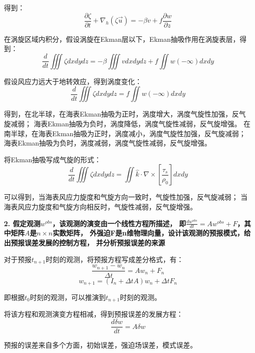 \documentclass{article}
\begin{document}
得到：
$$\frac{\partial\zeta}{\partial t} + \nabla_h(\zeta\vec{u})
=-\beta v +f\frac{\partial w}{\partial z}$$

在涡旋区域内积分，假设涡旋在Ekman层以下，Ekman抽吸作用在涡旋表层，得到：
$$\frac{d}{dt}\iiint\zeta dxdydz
=-\beta\iiint v dxdydz + f\iint w(-\infty) dxdy$$

假设风应力远大于地转效应，得到涡度变化：
$$\frac{d}{dt}\iiint\zeta dxdydz
= f\iint  w(-\infty) dxdy$$

得到，在北半球，在海表Ekman抽吸为正时，涡度增大，涡度气旋性加强，反气旋减弱；
海表Ekman抽吸为负时，涡度降低，涡度气旋性减弱，反气旋增强。
在南半球，在海表Ekman抽吸为正时，涡度减小，涡度气旋性加强，反气旋减弱；
海表Ekman抽吸为负时，涡度减弱，涡度气旋性减弱，反气旋增强。

将Ekman抽吸写成气旋的形式：
$$\frac{d}{dt}\iiint\zeta dxdydz
=\iint\hat{k}\cdot \nabla \times \left[ \frac{{{\tau }_{s}}}{{{\rho }_{0}}} \right]dxdy$$

可以得到，当海表风应力旋度和气旋方向一致时，气旋性加强，反气旋减弱；
当海表风应力旋度和气旋方向相反时，气旋性减弱，反气旋增强。

\textbf{2. 假定观测$w^{obs}$，该观测的演变由一个线性方程所描述，
即$\frac{dw^{obs}}{dt} = Aw^{obs} + F$，其中矩阵$A$是$n\times n$实数矩阵，
外强迫F是n维物理向量，设计该观测的预报模式，给出预报误差发展的控制方程，
并分析预报误差的来源}

对于预报$t_{n+1}$时刻的观测，将预报方程写成差分格式，有：
$$\frac{w_{n+1} - w_{n}}{\Delta t} = Aw_{n} + F_n$$
$$w_{n+1} = (I_n+\Delta tA)w_{n} + \Delta tF_n$$

即根据$t_0$时刻的观测，可以推演到$t_{n+1}$时刻的观测。

将该方程和观测演变方程相减，得到预报误差的发展方程：
$$\frac{d\delta w}{dt} = A\delta w$$

预报的误差来自多个方面，初始误差，强迫场误差，模式误差。
\end{document}

